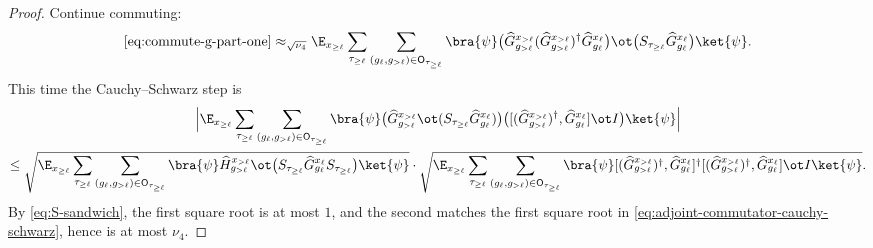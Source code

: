 \begin{proof}
	Continue commuting:
	\begin{align}
		\eqref{eq:commute-g-part-one}
		\approx_{\sqrt{\nu_4}}
		\E_{x_{\ge \ell}} \sum_{\tau_{\ge \ell}} \sum_{(g_\ell,g_{>\ell})\in \mathsf O_{\tau_{\ge \ell}}}
		\bra{\psi}
		\bigl(\widehat G_{g_{>\ell}}^{x_{>\ell}}(\widehat G_{g_{>\ell}}^{x_{>\ell}})^\dagger \widehat G_{g_\ell}^{x_\ell}\bigr)
		\ot \bigl(S_{\tau_{\ge \ell}}\widehat G_{g_\ell}^{x_\ell}\bigr)\ket{\psi}.
		\label{eq:commute-g-part-two}
	\end{align}
	This time the Cauchy--Schwarz step is
	\begin{multline}\label{eq:second-cauchy-schwarz-bound}
		\Bigl|
		\E_{x_{\ge \ell}} \sum_{\tau_{\ge \ell}} \sum_{(g_\ell,g_{>\ell})\in \mathsf O_{\tau_{\ge \ell}}}
		\bra{\psi}
		\bigl(\widehat G_{g_{>\ell}}^{x_{>\ell}} \ot (S_{\tau_{\ge \ell}}\widehat G_{g_\ell}^{x_\ell})\bigr)
		\bigl([(\widehat G_{g_{>\ell}}^{x_{>\ell}})^\dagger,\widehat G_{g_\ell}^{x_\ell}] \ot I\bigr)
		\ket{\psi}
		\Bigr|\\
		\le
		\sqrt{
		\E_{x_{\ge \ell}} \sum_{\tau_{\ge \ell}} \sum_{(g_\ell,g_{>\ell})\in \mathsf O_{\tau_{\ge \ell}}}
		\bra{\psi}
		\widehat H_{g_{>\ell}}^{x_{>\ell}}
		\ot \bigl(S_{\tau_{\ge \ell}}\widehat G_{g_\ell}^{x_\ell}S_{\tau_{\ge \ell}}\bigr)
		\ket{\psi}
		}
		\cdot
		\sqrt{
		\E_{x_{\ge \ell}} \sum_{\tau_{\ge \ell}} \sum_{(g_\ell,g_{>\ell})\in \mathsf O_{\tau_{\ge \ell}}}
		\bra{\psi}
		[(\widehat G_{g_{>\ell}}^{x_{>\ell}})^\dagger,\widehat G_{g_\ell}^{x_\ell}]^\dagger
		[(\widehat G_{g_{>\ell}}^{x_{>\ell}})^\dagger,\widehat G_{g_\ell}^{x_\ell}]
		\ot I
		\ket{\psi}
		}.
	\end{multline}
	By \ref{eq:S-sandwich}, the first square root is at most $1$, and the second matches the first square root in \ref{eq:adjoint-commutator-cauchy-schwarz}, hence is at most $\nu_4$.


\end{proof}
